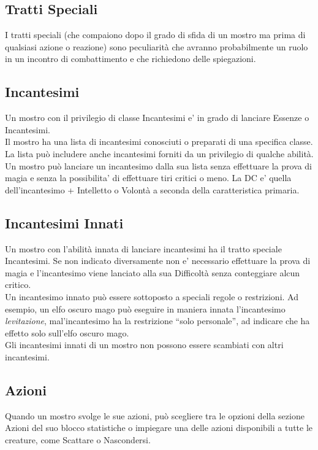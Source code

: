 \subsection{Tratti Speciali}

I tratti speciali (che compaiono dopo il grado di sfida di un mostro ma prima di qualsiasi azione o reazione) sono peculiarità che avranno probabilmente un ruolo in un incontro di combattimento e che richiedono delle spiegazioni.

\subsection{Incantesimi}

Un mostro con il privilegio di classe Incantesimi e' in grado di lanciare Essenze o Incantesimi.\\
Il mostro ha una lista di incantesimi conosciuti o preparati di una specifica classe. La lista può includere anche incantesimi forniti da un privilegio di qualche abilità. \\
Un mostro può lanciare un incantesimo dalla sua lista senza effettuare la prova di magia e senza la possibilita' di effettuare tiri critici o meno. La DC e' quella dell'incantesimo + Intelletto o Volontà a seconda della caratteristica primaria.

\subsection{Incantesimi Innati}

Un mostro con l'abilità innata di lanciare incantesimi ha il tratto speciale Incantesimi.
Se non indicato diversamente non e' necessario effettuare la prova di magia e l'incantesimo viene lanciato alla sua Difficoltà senza conteggiare alcun critico.\\
Un incantesimo innato può essere sottoposto a speciali regole o restrizioni. Ad esempio, un elfo oscuro mago può eseguire in maniera innata l'incantesimo \emph{levitazione}, mal'incantesimo ha la  restrizione ``solo personale'', ad indicare che ha effetto solo
sull'elfo oscuro mago. \\
Gli incantesimi innati di un mostro non possono essere scambiati con altri incantesimi. 

\subsection{Azioni}

Quando un mostro svolge le sue azioni, può scegliere tra le opzioni della sezione Azioni del suo blocco statistiche o impiegare una delle azioni disponibili a tutte le creature, come Scattare o Nascondersi.

